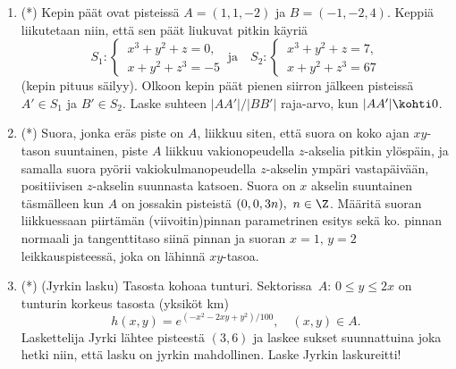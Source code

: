 \begin{enumerate}

\item (*)
Kepin päät ovat pisteissä $A=(1,1,-2)$ ja $B=(-1,-2,4)$. Keppiä liikutetaan niin, että sen päät
liukuvat pitkin käyriä 
\[
S_1: \begin{cases} \,x^3+y^2+z=0, \\ \,x+y^2+z^3=-5 \end{cases} \ \text{ja} \quad
S_2: \begin{cases} \,x^3+y^2+z=7, \\ \,x+y^2+z^3=67 \end{cases}
\]
(kepin pituus säilyy). Olkoon kepin päät pienen siirron jälkeen pisteissä $A' \in S_1$ ja
$B' \in S_2$. Laske suhteen $|AA'|/|BB'|$ raja-arvo, kun $|AA'| \kohti 0$.
 
\item (*)
Suora, jonka eräs piste on $A$, liikkuu siten, että suora on koko ajan $xy$-tason suuntainen,
piste $A$ liikkuu vakionopeudella $z$-akselia pitkin ylöspäin, ja samalla suora pyörii
vakiokulmanopeudella $z$-akselin ympäri vastapäivään, positiivisen $z$-akselin suunnasta 
katsoen. Suora on $x$ akselin suuntainen täsmälleen kun $A$ on jossakin pisteistä 
$(0,0,3n),\ n\in\Z$. Määritä suoran liikkuessaan piirtämän (viivoitin)pinnan parametrinen
esitys sekä ko. pinnan normaali ja tangenttitaso siinä pinnan ja suoran $x=1,\, y=2$ 
leikkauspisteessä, joka on lähinnä $xy$-tasoa.

\item (*) 
(Jyrkin lasku) Tasosta kohoaa tunturi. Sektorissa $\,A:\,0 \le y \le 2x$ on tunturin korkeus
tasosta (yksiköt km)
\[
h(x,y) = e^{(-x^2-2xy+y^2)/100}, \quad (x,y) \in A.
\]
Laskettelija Jyrki lähtee pisteestä $(3,6)$ ja laskee sukset suunnattuina joka hetki niin, että
lasku on jyrkin mahdollinen. Laske Jyrkin laskureitti!

\end{enumerate}